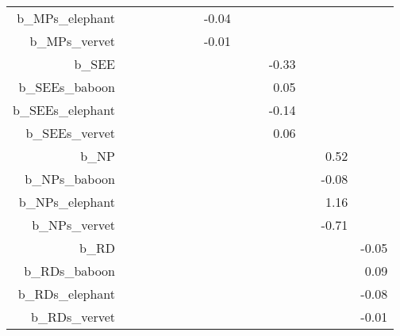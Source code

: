 \begin{table}[ht]
\begin{tabular}{rrrrrrrrrrrrrr}
  b\_MPs\_elephant &  &  &  &  &  &  & -0.04 &  &  &  &  &  &  \\ 
  b\_MPs\_vervet &  &  &  &  &  &  & -0.01 &  &  &  &  &  &  \\ 
  b\_SEE &  &  &  &  &  &  &  &  &  & -0.33 &  &  &  \\ 
  b\_SEEs\_baboon &  &  &  &  &  &  &  &  &  & 0.05 &  &  &  \\ 
  b\_SEEs\_elephant &  &  &  &  &  &  &  &  &  & -0.14 &  &  &  \\ 
  b\_SEEs\_vervet &  &  &  &  &  &  &  &  &  & 0.06 &  &  &  \\ 
  b\_NP &  &  &  &  &  &  &  &  &  &  &  & 0.52 &  \\ 
  b\_NPs\_baboon &  &  &  &  &  &  &  &  &  &  &  & -0.08 &  \\ 
  b\_NPs\_elephant &  &  &  &  &  &  &  &  &  &  &  & 1.16 &  \\ 
  b\_NPs\_vervet &  &  &  &  &  &  &  &  &  &  &  & -0.71 &  \\ 
  b\_RD &  &  &  &  &  &  &  &  &  &  &  &  & -0.05 \\ 
  b\_RDs\_baboon &  &  &  &  &  &  &  &  &  &  &  &  & 0.09 \\ 
  b\_RDs\_elephant &  &  &  &  &  &  &  &  &  &  &  &  & -0.08 \\ 
  b\_RDs\_vervet &  &  &  &  &  &  &  &  &  &  &  &  & -0.01 \\ 
   \hline
\end{tabular}
\end{table}
